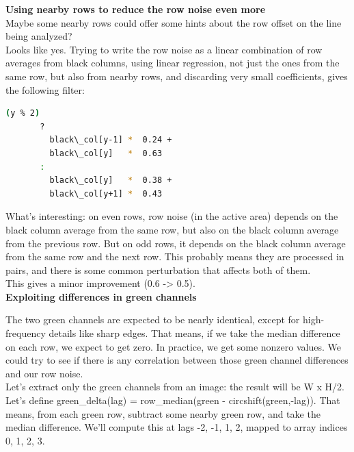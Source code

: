 \textbf{Using nearby rows to reduce the row noise even more}\\

Maybe some nearby rows could offer some hints about the row offset on the line being analyzed?\\

Looks like yes. Trying to write the row noise as a linear combination of row averages from black columns, using linear regression, not just the ones from the same row, but also from nearby rows, and discarding very small coefficients, gives the following filter:\\

 \begin{lstlisting}[language=bash,morekeywords=$,keywordstyle=\bfseries,frame=none,xleftmargin=.25in,belowskip=2em, aboveskip=2em]
    (y % 2)
       ?
         black\_col[y-1] *  0.24 +
         black\_col[y]   *  0.63
       :
         black\_col[y]   *  0.38 +
         black\_col[y+1] *  0.43
\end{lstlisting}

What's interesting: on even rows, row noise (in the active area) depends on the black column average from the same row, but also on the black column average from the previous row. But on odd rows, it depends on the black column average from the same row and the next row. This probably means they are processed in pairs, and there is some common perturbation that affects both of them.\\

This gives a minor improvement (0.6 -> 0.5). \\

\textbf{Exploiting differences in green channels}

The two green channels are expected to be nearly identical, except for high-frequency details like sharp edges. That means, if we take the median difference on each row, we expect to get zero. In practice, we get some nonzero values. We could try to see if there is any correlation between those green channel differences and our row noise.\\

Let's extract only the green channels from an image: the result will be W x H/2. Let's define green\_delta(lag) = row\_median(green - circshift(green,-lag)). That means, from each green row, subtract some nearby green row, and take the median difference. We'll compute this at lags -2, -1, 1, 2, mapped to array indices 0, 1, 2, 3.\\

